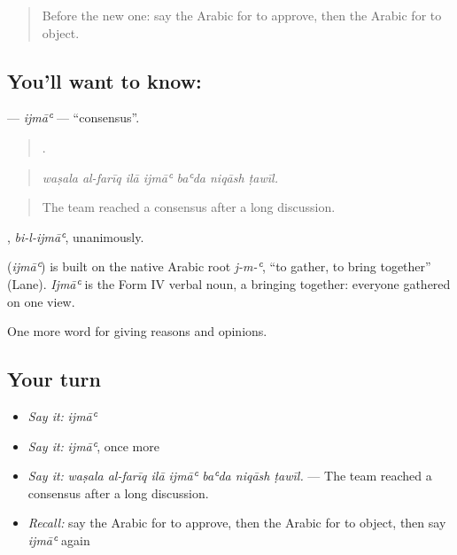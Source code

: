 \label{lesson:AR-C360-ijma}



\begin{quote}
Before the new one: say the Arabic for to approve, then the Arabic for to object.
\end{quote}

\subsection*{You'll want to know: }
\textbf{} — \emph{ijmāʿ} — \textquotedblleft{}consensus\textquotedblright{}.

\begin{quote}
      .
\end{quote}

\begin{quote}
\emph{waṣala al-farīq ilā ijmāʿ baʿda niqāsh ṭawīl.}
\end{quote}

\begin{quote}
The team reached a consensus after a long discussion.
\end{quote}

, \emph{bi-l-ijmāʿ}, unanimously.

\begin{cousinweb}
\textbf{} (\emph{ijmāʿ}) is built on the native Arabic root \emph{j-m-ʿ}, \textquotedblleft{}to gather, to bring together\textquotedblright{} (Lane). \emph{Ijmāʿ} is the Form IV verbal noun, a bringing together: everyone gathered on one view.
\end{cousinweb}

\begin{grammarlens}[title={What you've built}]
One more word for giving reasons and opinions.
\end{grammarlens}

\subsection*{Your turn}
\begin{itemize}
\raggedright
  \item \emph{Say it:} \emph{ijmāʿ}
  \item \emph{Say it:} \emph{ijmāʿ}, once more
  \item \emph{Say it:} \emph{waṣala al-farīq ilā ijmāʿ baʿda niqāsh ṭawīl.} — The team reached a consensus after a long discussion.
  \item \emph{Recall:} say the Arabic for to approve, then the Arabic for to object, then say \emph{ijmāʿ} again
\end{itemize}

